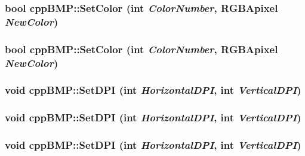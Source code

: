 \hypertarget{classcpp_b_m_p_954ee0b08e8b0e9455fe5c4a9e7a7181}{
\subsubsection[{SetColor}]{\setlength{\rightskip}{0pt plus 5cm}bool cppBMP::SetColor (int {\em ColorNumber}, \/  {\bf RGBApixel} {\em NewColor})}}
\label{classcpp_b_m_p_954ee0b08e8b0e9455fe5c4a9e7a7181}


\hypertarget{classcpp_b_m_p_954ee0b08e8b0e9455fe5c4a9e7a7181}{
\subsubsection[{SetColor}]{\setlength{\rightskip}{0pt plus 5cm}bool cppBMP::SetColor (int {\em ColorNumber}, \/  {\bf RGBApixel} {\em NewColor})}}
\label{classcpp_b_m_p_954ee0b08e8b0e9455fe5c4a9e7a7181}


\hypertarget{classcpp_b_m_p_96505f0e4666bd19d0c60e8eed948158}{
\subsubsection[{SetDPI}]{\setlength{\rightskip}{0pt plus 5cm}void cppBMP::SetDPI (int {\em HorizontalDPI}, \/  int {\em VerticalDPI})}}
\label{classcpp_b_m_p_96505f0e4666bd19d0c60e8eed948158}


\hypertarget{classcpp_b_m_p_96505f0e4666bd19d0c60e8eed948158}{
\subsubsection[{SetDPI}]{\setlength{\rightskip}{0pt plus 5cm}void cppBMP::SetDPI (int {\em HorizontalDPI}, \/  int {\em VerticalDPI})}}
\label{classcpp_b_m_p_96505f0e4666bd19d0c60e8eed948158}


\hypertarget{classcpp_b_m_p_96505f0e4666bd19d0c60e8eed948158}{
\subsubsection[{SetDPI}]{\setlength{\rightskip}{0pt plus 5cm}void cppBMP::SetDPI (int {\em HorizontalDPI}, \/  int {\em VerticalDPI})}}
\label{classcpp_b_m_p_96505f0e4666bd19d0c60e8eed948158}


